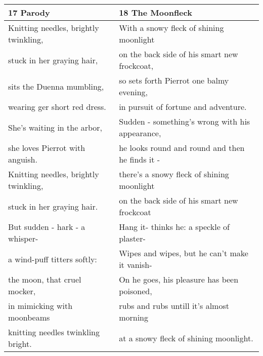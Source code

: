 \begin{table}[h!]
\begin{tabular}{p{8.0cm}|p{8.0cm}}
17 Parody& 18 The Moonfleck\\\hline
Knitting needles, brightly twinkling,& With a snowy fleck of shining moonlight\\
stuck in her graying hair,& on the back side of his smart new frockcoat,\\
sits the Duenna mumbling,& so sets forth Pierrot one balmy evening,\\
wearing ger short red dress.& in pursuit of fortune and adventure.\\
She's waiting in the arbor,& Sudden - something's wrong with his appearance,\\
she loves Pierrot with anguish.& he looks round and round and then he finds it - \\
Knitting needles, brightly twinkling,& there's a snowy fleck of shining moonlight\\
stuck in her graying hair.& on the back side of his smart new frockcoat\\
But sudden - hark - a whisper- & Hang it- thinks he: a speckle of plaster- \\
a wind-puff titters softly:& Wipes and wipes, but he can't make it vanish-\\ 
the moon, that cruel mocker,& On he goes, his pleasure has been poisoned,\\
in mimicking with moonbeams& rubs and rubs untill it's almost morning\\
knitting needles twinkling bright.& at a snowy fleck of shining moonlight.\\\hline

\end{tabular}
\end{table}

